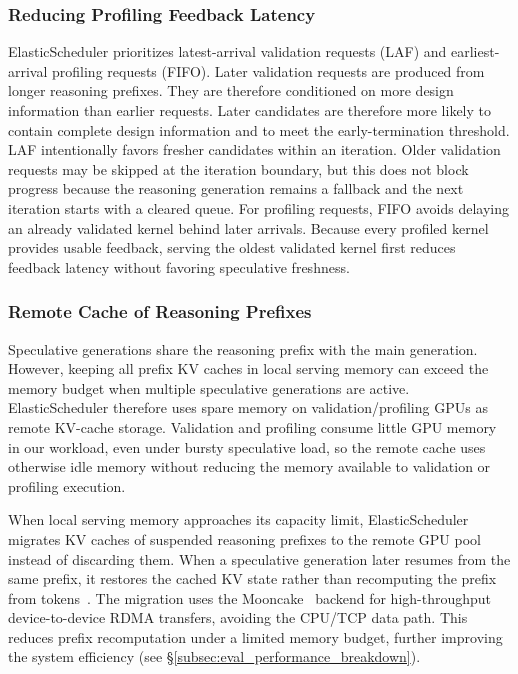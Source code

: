 \subsubsection{Reducing Profiling Feedback Latency}\label{subsubsec:reduce_prof_latency}

ElasticScheduler prioritizes latest-arrival validation requests (LAF) and
earliest-arrival profiling requests (FIFO).
Later validation requests are produced from longer reasoning prefixes.
They are therefore conditioned on more design information than earlier requests.
Later candidates are therefore more likely to contain complete design
information and to meet the early-termination threshold.
LAF intentionally favors fresher candidates within an iteration.
Older validation requests may be skipped at the iteration boundary, but this does
not block progress because the reasoning generation remains a fallback and
the next iteration starts with a cleared queue.
For profiling requests, FIFO avoids delaying an already validated kernel behind
later arrivals.
Because every profiled kernel provides usable feedback, serving the oldest
validated kernel first reduces feedback latency without favoring speculative
freshness.

\subsubsection{Remote Cache of Reasoning Prefixes}\label{subsubsec:remote_cache}

Speculative generations share the reasoning prefix with the main generation.
However, keeping all prefix KV caches in local serving memory can exceed the
memory budget when multiple speculative generations are active.
ElasticScheduler therefore uses spare memory on validation/profiling GPUs as
remote KV-cache storage.
Validation and profiling consume little GPU memory in our workload, even under
bursty speculative load, so the remote cache uses otherwise idle memory without
reducing the memory available to validation or profiling execution.

When local serving memory approaches its capacity limit, ElasticScheduler
migrates KV caches of suspended reasoning prefixes to the remote GPU pool
instead of discarding them.
When a speculative generation later resumes from the same prefix, it restores
the cached KV state rather than recomputing the prefix from tokens~\cite{vLLM}.
The migration uses the Mooncake~\cite{Mooncake} backend for high-throughput device-to-device
RDMA transfers, avoiding the CPU/TCP data path.
This reduces prefix recomputation under a limited memory budget, further improving the system efficiency (see \S\ref{subsec:eval_performance_breakdown}).

